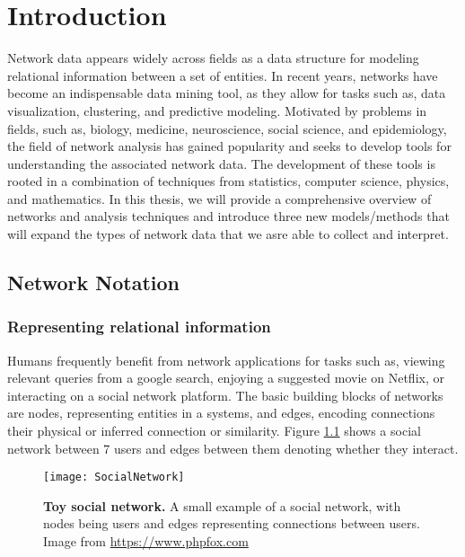 





% 

\chapter{Introduction}
Network data appears widely across fields as a data structure for modeling relational information between a set of entities.  In recent years, networks have become an indispensable data mining tool, as they allow for tasks such as, data visualization, clustering, and predictive modeling.  Motivated by problems in fields, such as, biology, medicine, neuroscience, social science, and epidemiology, the field of network analysis has gained popularity and seeks to develop tools for understanding the associated network data. The development of these tools is rooted in a combination of techniques from statistics, computer science, physics, and mathematics. In this thesis, we will provide a comprehensive overview of networks and analysis techniques and introduce three new models/methods that will expand the types of network data that we asre able to collect and interpret. 

\section{Network Notation}

\subsection{Representing relational information}

Humans frequently benefit from network applications for tasks such as, viewing relevant queries from a google search, enjoying a suggested movie on Netflix, or interacting on a social network platform. The basic building blocks of networks are nodes, representing entities in a systems, and edges, encoding connections their physical or inferred connection or similarity. Figure \ref{fig:social} shows a social network between 7 users and edges between them denoting whether they interact. 
\begin{figure}
\begin{center}
\texttt{[image: SocialNetwork]}
\caption{{\bf Toy social network.} A small example of a social network, with nodes being users and edges representing connections between users. Image from \url{https://www.phpfox.com}}
\label{fig:social}
\end{center}
\end{figure}

